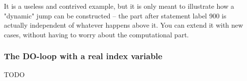 It is a useless and contrived example, but it is only meant to illustrate how
a "dynamic" jump can be constructed -- the part after statement label 900
is actually independent of whatever happens above it. You can extend it with
new cases, without having to worry about the computational part.

\subsubsection{The DO-loop with a real index variable}
TODO
